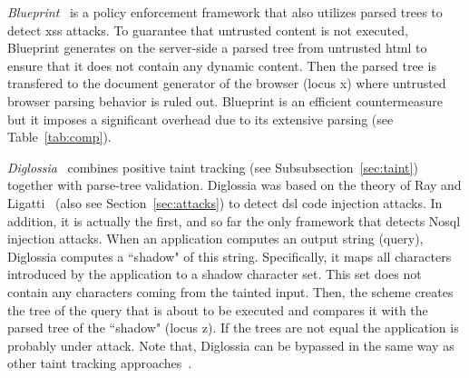 \documentclass[conference]{IEEEtran}
\begin{document}
{\it Blueprint}~\cite{LV09} is a policy
enforcement framework that also utilizes parsed trees
to detect {\sc xss} attacks. To guarantee
that untrusted content is not executed, Blueprint generates
on the server-side a parsed tree from untrusted {\sc html}
to ensure that it does not contain any dynamic content.
Then the parsed tree is transfered to the document
generator of the browser (locus {\sc x}) where untrusted
browser parsing behavior is ruled out.
Blueprint is an efficient countermeasure but it
imposes a significant overhead due to its
extensive parsing (see Table~\ref{tab:comp}).

{\it Diglossia}~\cite{SMS13} combines positive taint tracking
(see Subsubsection~\ref{sec:taint}) together with
parse-tree validation. Diglossia was based on the
theory of Ray and Ligatti~\cite{RL12b} (also see
Section~\ref{sec:attacks}) to detect {\sc dsl}
code injection attacks. In addition, it is actually
the first, and so far the only framework that detects
No{\sc sql} injection attacks.
When an application computes an output string (query),
Diglossia computes a ``shadow" of this string.
Specifically, it maps all characters introduced by
the application to a shadow character set.
This set does not contain any characters coming
from the tainted input. Then, the scheme
creates the tree of the query that
is about to be executed and compares it with the parsed tree
of the ``shadow" (locus {\sc z}).
If the trees are not equal the application is probably
under attack. Note that, Diglossia can be bypassed in the same
way as other taint tracking approaches~\cite{NBR14}.
\end{document}
